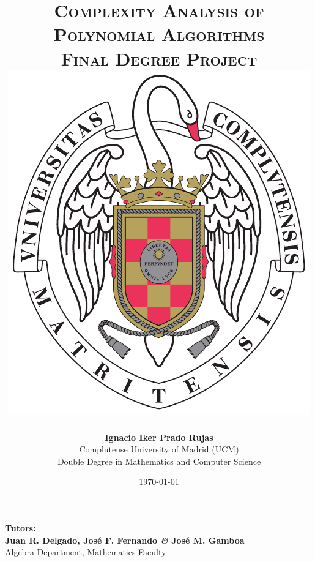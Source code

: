 \documentclass[11pt, a4paper, english, twoside, notitlepage, openright]{report}
\begin{document}
\begin{titlepage}

\title{\Huge{\textsc{Complexity Analysis of\\
Polynomial Algorithms}} \\
\vspace{0.5cm}
\Large{\textsc{Final Degree Project}}\\
\vspace{1.5cm}
\protect\includegraphics[scale=0.9]{escudo_ucm.pdf}
\vspace{1.5cm}}
\author{\textbf{Ignacio Iker Prado Rujas} \\
Complutense University of Madrid (UCM) \\
Double Degree in Mathematics and Computer Science}
\date{\today}
\maketitle
\thispagestyle{empty}

\begin{center}
\textbf{Tutors:} \\
\textbf{Juan R. Delgado, Jos\'e F. Fernando \textit{\&} Jos\'e M. Gamboa} \\
\vspace{0.1cm}
Algebra Department, Mathematics Faculty
\end{center}

\end{titlepage}
\end{document}
